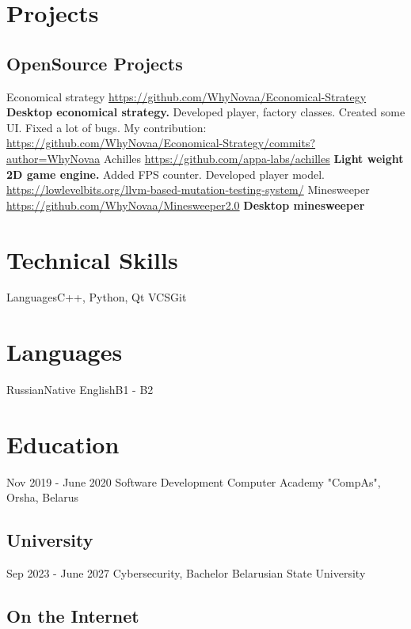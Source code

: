 \documentclass[11pt,a4paper]{moderncv}
\begin{document}
\maketitle

\section{Projects}
  \subsection{OpenSource Projects}
  \cvline
    {Economical strategy}
    {\url{https://github.com/WhyNovaa/Economical-Strategy}\newline{}
    \textbf{Desktop economical strategy.}\newline{}
    Developed player, factory classes.\newline{}
    Created some UI. \newline{}
    Fixed a lot of bugs.\newline{}
    My contribution:\newline{}
    \url{https://github.com/WhyNovaa/Economical-Strategy/commits?author=WhyNovaa}}
  \cvline
    {Achilles}
    {\url{https://github.com/appa-labs/achilles}\newline{}
    \textbf{Light weight 2D game engine.}\newline{}
    Added FPS counter.\newline{}
    Developed player model. \newline{}
    \url{https://lowlevelbits.org/llvm-based-mutation-testing-system/}
    }
  \cvline 
    {Minesweeper}
    {\url{https://github.com/WhyNovaa/Minesweeper2.0}\newline{}
    \textbf{Desktop minesweeper}\newline{}
    }
    
\section{Technical Skills}
\cvline
  {Languages}{C++, Python, Qt}
\cvline
  {VCS}{Git}
\section {Languages}
\cvline 
  {Russian}{Native}
\cvline 
  {English}{B1 - B2}
\section{Education}
  \cventry
    {Nov 2019 - June 2020}
    {Software Development}
    {Computer Academy "CompAs", Orsha, Belarus}
    {}{}{}
  \subsection{University}
  \cventry
    {Sep 2023 - June 2027}
    {Cybersecurity, Bachelor}
    {Belarusian State University}
    {}{}{}


  \subsection{On the Internet}
\end{document}
